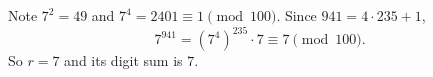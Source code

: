 Note $7^2=49$ and $7^4=2401\equiv1\pmod{100}$. Since $941=4\cdot235+1$,
\[
7^{941}=(7^4)^{235}\cdot7\equiv7\pmod{100}.
\]
So $r=7$ and its digit sum is $\boxed{7}$.
